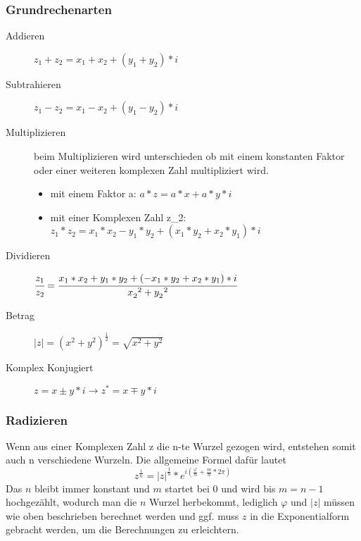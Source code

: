 \documentclass[a4paper]{scrartcl}
\begin{document}
            \subsubsection{Grundrechenarten}
                \begin{description}
                    \item[Addieren] $z_1 + z_2 = x_1 + x_2 + (y_1 + y_2)*i$ 
                    \item[Subtrahieren] $z_1 - z_2 = x_1 - x_2 + (y_1 - y_2)*i$ 
                    \item[Multiplizieren] beim Multiplizieren wird unterschieden ob mit einem konstanten Faktor oder einer weiteren komplexen Zahl multipliziert wird.
                    \begin{itemize}
                        \item mit einem Faktor a: $a * z = a * x + a * y * i $
                        \item mit einer Komplexen Zahl z_2: $z_1 * z_2 = x_1 * x_2 - y_1 * y_2 + (x_1 * y_2 + x_2 * y_1) * i $
                    \end{itemize}  
                    \item[Dividieren]  $\cfrac{z_1}{z_2} = \cfrac{x_1*x_2 + y_1*y_2 + (-x_1*y_2 + x_2*y_1)*i}{x_2^{\;\;2} + y_2^{\;\;2}}$
                    \item[Betrag] $|z| = (x^2 + y^2)^\frac{1}{2} = \sqrt{x^2 + y^2}$ 
                    \item[Komplex Konjugiert] $z = x \pm y*i \rightarrow z^* = x \mp y*i$ 
                \end{description}
                
            \subsubsection{Radizieren}
            Wenn aus einer Komplexen Zahl z die n-te Wurzel gezogen wird, entstehen somit auch n verschiedene Wurzeln.
            Die allgemeine Formel dafür lautet 
            \begin{equation*}
                z^{\frac{1}{n}} = |z|^{\frac{1}{n}} * e^{i(\frac{\varphi}{n} + \frac{m}{n}* 2\pi)}
            \end{equation*}
            Das $n$ bleibt immer konstant und $m$ startet bei 0 und wird bis $m = n-1$ hochgezählt, wodurch man die $n$ Wurzel herbekommt,
            lediglich $\varphi$ und $|z|$ müssen wie oben beschrieben berechnet werden und ggf. muss $z$ in die Exponentialform gebracht werden, um die Berechnungen zu erleichtern.  
        \newpage
\end{document}
